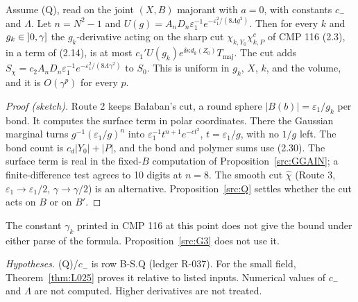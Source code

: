 \begin{proposition}\label{src:G3}
Assume (Q), read on the joint $(X,B)$ majorant with $a=0$, with constants $c_-$ and $\Lambda$. Let $n=N^2-1$ and $U(g)=A_nD_n\varepsilon_1^{-1}e^{-\varepsilon_1^2/(8\Lambda g^2)}$. Then for every $k$ and $g_k\in\mathopen{]}0,\gamma\mathclose{]}$ the $g_k$-derivative acting on the sharp cut $\chi_{k,Y_0}\chi^c_{k,P}$ of CMP 116 (2.3), in a term of (2.14), is at most $c_1'U(g_k)e^{\delta\kappa d_k(Z_0)}T_{\mathrm{maj}}$. The cut adds $S_\chi=c_2A_nD_n\varepsilon_1^{-1}e^{-\varepsilon_1^2/(8\Lambda\gamma^2)}$ to $S_0$. This is uniform in $g_k$, $X$, $k$, and the volume, and it is $O(\gamma^p)$ for every $p$.
\end{proposition}
\begin{proof}[Proof (sketch)]
Route 2 keeps Ba{\l}aban's cut, a round sphere $|B(b)|=\varepsilon_1/g_k$ per bond. It computes the surface term in polar coordinates. There the Gaussian marginal turns $g^{-1}(\varepsilon_1/g)^n$ into $\varepsilon_1^{-1}t^{n+1}e^{-ct^2}$, $t=\varepsilon_1/g$, with no $1/g$ left. The bond count is $c_d|Y_0|+|P|$, and the bond and polymer sums use (2.30). The surface term is real in the fixed-$B$ computation of Proposition~\ref{src:GGAIN}; a finite-difference test agrees to 10 digits at $n=8$. The smooth cut $\hat\chi$ (Route 3, $\varepsilon_1\to\varepsilon_1/2$, $\gamma\to\gamma/2$) is an alternative. Proposition~\ref{src:Q} settles whether the cut acts on $B$ or on $B'$.
\end{proof}
\begin{remark}
The constant $\gamma_k$ printed in CMP 116 at this point does not give the bound under either parse of the formula. Proposition~\ref{src:G3} does not use it.
\end{remark}
\emph{Hypotheses.} (Q)/$c_-$ is row B-S.Q (ledger R-037). For the small field, Theorem~\ref{thm:L025} proves it relative to listed inputs. Numerical values of $c_-$ and $\Lambda$ are not computed. Higher derivatives are not treated.

